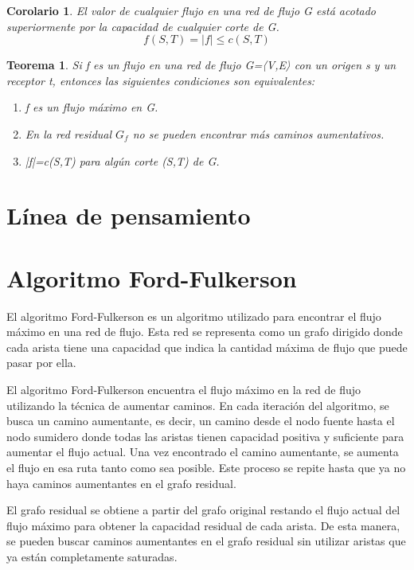 \documentclass[10pt]{article} %
\newtheorem{thm}{Teorema}
\newtheorem{col}{Corolario}
\begin{document}
	\begin{col}
		El valor de cualquier flujo en una red de flujo G está acotado superiormente por la capacidad de cualquier corte de G.
		\begin{equation}
			f(S,T) = |f| \leq c(S,T)
		\end{equation}
	\end{col}
	
	\begin{thm}
		Si f es un flujo en una red de flujo G=〈V,E〉 con un origen s y un receptor t, entonces las siguientes condiciones son equivalentes:
		\begin{enumerate}
			\item f es un flujo máximo en G. 
			\item En la red residual $G_f$ no se pueden encontrar más caminos aumentativos.
			\item  |f|=c(S,T) para algún corte (S,T) de G.
		\end{enumerate}
	\end{thm}
	\section{L\'inea de pensamiento}
	
	\section{Algoritmo Ford-Fulkerson}
	
	El algoritmo Ford-Fulkerson es un algoritmo utilizado para encontrar el flujo máximo en una red de flujo. Esta red se representa como un grafo dirigido donde cada arista tiene una capacidad que indica la cantidad máxima de flujo que puede pasar por ella.
	
	El algoritmo Ford-Fulkerson encuentra el flujo máximo en la red de flujo utilizando la técnica de aumentar caminos. En cada iteración del algoritmo, se busca un camino aumentante, es decir, un camino desde el nodo fuente hasta el nodo sumidero donde todas las aristas tienen capacidad positiva y suficiente para aumentar el flujo actual. Una vez encontrado el camino aumentante, se aumenta el flujo en esa ruta tanto como sea posible. Este proceso se repite hasta que ya no haya caminos aumentantes en el grafo residual.
	
	El grafo residual se obtiene a partir del grafo original restando el flujo actual del flujo máximo para obtener la capacidad residual de cada arista. De esta manera, se pueden buscar caminos aumentantes en el grafo residual sin utilizar aristas que ya están completamente saturadas.
	
\end{document}
